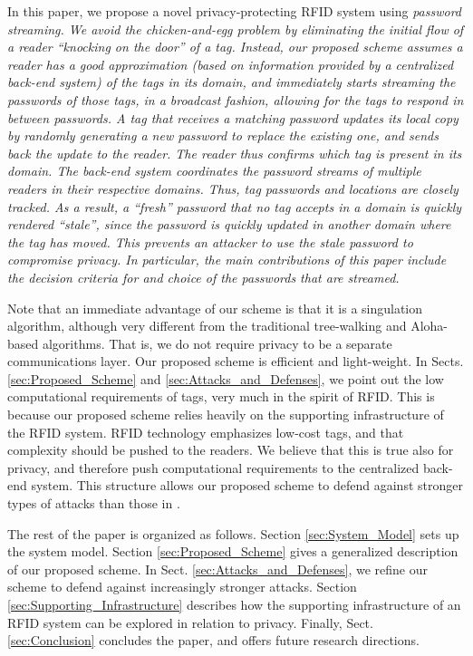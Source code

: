 In this paper, we propose a novel privacy-protecting RFID system using \em password streaming\em.  We avoid the chicken-and-egg problem by eliminating the initial flow of a reader ``knocking on the door'' of a tag.  Instead, our proposed scheme assumes a reader has a good approximation (based on information provided by a centralized back-end system) of the tags in its domain, and immediately starts streaming the passwords of those tags, in a broadcast fashion, allowing for the tags to respond in between passwords.  A tag that receives a matching password updates its local copy by randomly generating a new password to replace the existing one, and sends back the update to the reader.  The reader thus confirms which tag is present in its domain.  The back-end system coordinates the password streams of multiple readers in their respective domains.  Thus, tag passwords and locations are closely tracked.  As a result, a ``fresh'' password that no tag accepts in a domain is quickly rendered ``stale'', since the password is quickly updated in another domain where the tag has moved.  This prevents an attacker to use the stale password to compromise privacy.  In particular, the main contributions of this paper include the decision criteria for and choice of the passwords that are streamed.

Note that an immediate advantage of our scheme is that it is a singulation algorithm, although very different from the traditional tree-walking \cite{conf:Law01} and Aloha-based \cite{conf:Vogt01} algorithms.  That is, we do not require privacy to be a separate communications layer.  Our proposed scheme is efficient and light-weight.  In Sects. \ref{sec:Proposed_Scheme} and \ref{sec:Attacks_and_Defenses}, we point out the low computational requirements of tags, very much in the spirit of RFID.  This is because our proposed scheme relies heavily on the supporting infrastructure of the RFID system.  RFID technology emphasizes low-cost tags, and that complexity should be pushed to the readers.  We believe that this is true also for privacy, and therefore push computational requirements to the centralized back-end system.  This structure allows our proposed scheme to defend against stronger types of attacks than those in \cite{conf:Juels01}.

The rest of the paper is organized as follows.  Section \ref{sec:System_Model} sets up the system model.  Section \ref{sec:Proposed_Scheme} gives a generalized description of our proposed scheme.  In Sect. \ref{sec:Attacks_and_Defenses}, we refine our scheme to defend against increasingly stronger attacks.  Section \ref{sec:Supporting_Infrastructure} describes how the supporting infrastructure of an RFID system can be explored in relation to privacy.  Finally, Sect. \ref{sec:Conclusion} concludes the paper, and offers future research directions.

